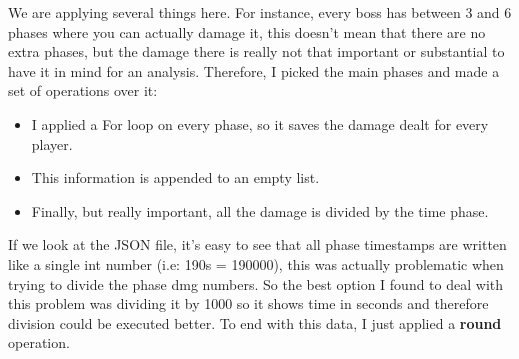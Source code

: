 \documentclass[12pt,a4paper]{article}
\begin{document}
    \newpage

    We are applying several things here. For instance, every boss has between 3 and 6 phases where you can actually damage it,
    this doesn't mean that there are no extra phases, but the damage there is really not that important or substantial to have
    it in mind for an analysis. Therefore, I picked the main phases and made a set of operations over it:

    \begin{itemize}
        \item I applied a For loop on every phase, so it saves the damage dealt for every player.
        \item This information is appended to an empty list.
        \item Finally, but really important, all the damage is divided by the time phase.
    \end{itemize}

    \bigskip

    If we look at the JSON file, it's easy to see that all phase timestamps are written like a single int number (i.e: 190s = 190000),
    this was actually problematic when trying to divide the phase dmg numbers. So the best option I found to deal with this problem
    was dividing it by 1000 so it shows time in seconds and therefore division could be executed better. To end with this data, I just
    applied a \textbf{round} operation.
\end{document}
